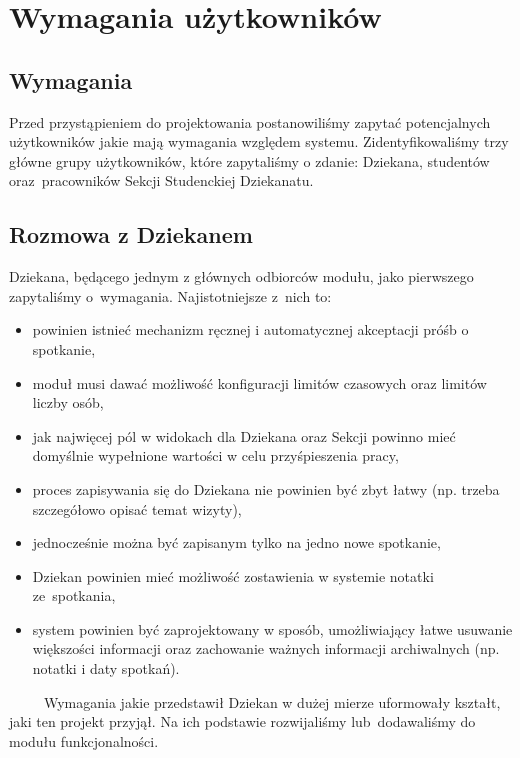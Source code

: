 \documentclass[licencjacka]{pracamgr}
\begin{document}
\chapter{Wymagania użytkowników} \label{chap:wymagania}

\section{Wymagania}
Przed przystąpieniem do projektowania postanowiliśmy zapytać potencjalnych użytkowników jakie mają wymagania względem systemu. Zidentyfikowaliśmy trzy główne grupy użytkowników, które zapytaliśmy o zdanie: Dziekana, studentów oraz~pracowników Sekcji Studenckiej Dziekanatu.

\section{Rozmowa z Dziekanem}
Dziekana, będącego jednym z głównych odbiorców modułu, jako pierwszego zapytaliśmy o~wymagania. Najistotniejsze z~nich to:

\begin{itemize}
\setlength\itemsep{0,1em}
\item powinien istnieć mechanizm ręcznej i automatycznej akceptacji próśb o spotkanie,
\item moduł musi dawać możliwość konfiguracji limitów czasowych oraz limitów liczby osób,
\item jak najwięcej pól w widokach dla Dziekana oraz Sekcji powinno mieć domyślnie wypełnione wartości w celu przyśpieszenia pracy,
\item proces zapisywania się do Dziekana nie powinien być zbyt łatwy (np. trzeba szczegółowo opisać temat wizyty),
\item jednocześnie można być zapisanym tylko na jedno nowe spotkanie,
\item Dziekan powinien mieć możliwość zostawienia w systemie notatki ze~spotkania,
\item system powinien być zaprojektowany w sposób, umożliwiający łatwe usuwanie większości informacji oraz zachowanie ważnych informacji archiwalnych (np. notatki i daty spotkań).
\end{itemize}
~~~~~Wymagania jakie przedstawił Dziekan w dużej mierze uformowały kształt, jaki ten projekt przyjął. Na ich podstawie rozwijaliśmy lub~dodawaliśmy do modułu funkcjonalności.
\end{document}
